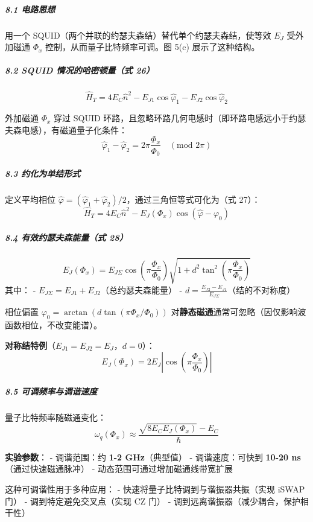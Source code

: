 \documentclass[12pt,a4paper,oneside]{ctexbook}
\let\oldsubparagraph\subparagraph
\renewcommand{\subparagraph}[1]{\oldsubparagraph{#1}\mbox{}}
\begin{document}
\subparagraph{8.1 电路思想}\label{ux7535ux8defux601dux60f3}

用一个 SQUID（两个并联的约瑟夫森结）替代单个约瑟夫森结，使等效 \(E_J\)
受外加磁通 \(\Phi_x\) 控制，从而量子比特频率可调。图 5(c)
展示了这种结构。

\subparagraph{8.2 SQUID 情况的哈密顿量（式
26）}\label{squid-ux60c5ux51b5ux7684ux54c8ux5bc6ux987fux91cfux5f0f-26}

\[\hat H_T = 4E_C\hat n^2 - E_{J1}\cos\hat\varphi_1 - E_{J2}\cos\hat\varphi_2\]

外加磁通 \(\Phi_x\) 穿过 SQUID
环路，且忽略环路几何电感时（即环路电感远小于约瑟夫森电感），有磁通量子化条件：
\[\hat\varphi_1 - \hat\varphi_2 = 2\pi\frac{\Phi_x}{\Phi_0} \quad (\text{mod } 2\pi)\]

\subparagraph{8.3
约化为单结形式}\label{ux7ea6ux5316ux4e3aux5355ux7ed3ux5f62ux5f0f}

定义平均相位
\(\hat\varphi = (\hat\varphi_1 + \hat\varphi_2)/2\)，通过三角恒等式可化为（式
27）：
\[\hat H_T = 4E_C\hat n^2 - E_J(\Phi_x)\cos(\hat\varphi - \varphi_0)\]

\subparagraph{8.4 有效约瑟夫森能量（式
28）}\label{ux6709ux6548ux7ea6ux745fux592bux68eeux80fdux91cfux5f0f-28}

\[E_J(\Phi_x) = E_{J\Sigma} \cos\left(\pi\frac{\Phi_x}{\Phi_0}\right) \sqrt{1 + d^2 \tan^2\left(\pi\frac{\Phi_x}{\Phi_0}\right)}\]
其中： - \(E_{J\Sigma} = E_{J1} + E_{J2}\)（总约瑟夫森能量） -
\(d = \frac{E_{J2} - E_{J1}}{E_{J\Sigma}}\)（结的不对称度）

相位偏置 \(\varphi_0 = \arctan\!\left(d\tan(\pi\Phi_x/\Phi_0)\right)\)
对\textbf{静态磁通}通常可忽略（因仅影响波函数相位，不改变能谱）。

\textbf{对称结特例}（\(E_{J1} = E_{J2} = E_J\)，\(d=0\)）：
\[E_J(\Phi_x) = 2E_J \left|\cos\left(\pi\frac{\Phi_x}{\Phi_0}\right)\right|\]

\subparagraph{8.5
可调频率与调谐速度}\label{ux53efux8c03ux9891ux7387ux4e0eux8c03ux8c10ux901fux5ea6}

量子比特频率随磁通变化：
\[\omega_q(\Phi_x) \approx \frac{\sqrt{8E_C E_J(\Phi_x)} - E_C}{\hbar}\]

\textbf{实验参数}： - 调谐范围：约 \textbf{1-2 GHz}（典型值） -
调谐速度：可快到 \textbf{10-20 ns}（通过快速磁通脉冲） -
动态范围可通过增加磁通线带宽扩展

这种可调谐性用于多种应用： - 快速将量子比特调到与谐振器共振（实现 iSWAP
门） - 调到特定避免交叉点（实现 CZ 门） -
调到远离谐振器（减少耦合，保护相干性）
\end{document}
